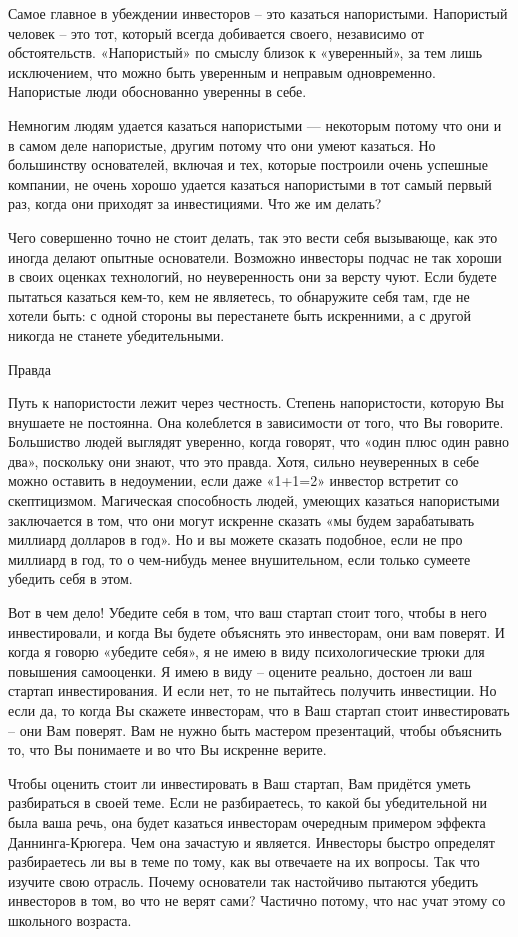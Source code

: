 \documentclass[ebook,12pt,oneside,openany]{memoir}
\begin{document}
Самое главное в убеждении инвесторов – это казаться напористыми.
Напористый человек – это тот, который всегда добивается своего,
независимо от обстоятельств. «Напористый» по смыслу близок к
«уверенный», за тем лишь исключением, что можно быть уверенным и
неправым одновременно. Напористые люди обоснованно уверенны в себе.

Немногим людям удается казаться напористыми — некоторым потому что они
и в самом деле напористые, другим потому что они умеют казаться. Но
большинству основателей, включая и тех, которые построили очень
успешные компании, не очень хорошо удается казаться напористыми в тот
самый первый раз, когда они приходят за инвестициями. Что же им
делать?

Чего совершенно точно не стоит делать, так это вести себя вызывающе,
как это иногда делают опытные основатели. Возможно инвесторы подчас не
так хороши в своих оценках технологий, но неуверенность они за версту
чуют. Если будете пытаться казаться кем-то, кем не являетесь, то
обнаружите себя там, где не хотели быть: с одной стороны вы
перестанете быть искренними, а с другой никогда не станете
убедительными.

Правда

Путь к напористости лежит через честность. Степень напористости,
которую Вы внушаете не постоянна. Она колеблется в зависимости от
того, что Вы говорите. Большиство людей выглядят уверенно, когда
говорят, что «один плюс один равно два», поскольку они знают, что это
правда. Хотя, сильно неуверенных в себе можно оставить в недоумении,
если даже «1+1=2» инвестор встретит со скептицизмом. Магическая
способность людей, умеющих казаться напористыми заключается в том, что
они могут искренне сказать «мы будем зарабатывать миллиард долларов в
год». Но и вы можете сказать подобное, если не про миллиард в год, то
о чем-нибудь менее внушительном, если только сумеете убедить себя в
этом.

Вот в чем дело! Убедите себя в том, что ваш стартап стоит того, чтобы
в него инвестировали, и когда Вы будете объяснять это инвесторам, они
вам поверят. И когда я говорю «убедите себя», я не имею в виду
психологические трюки для повышения самооценки. Я имею в виду –
оцените реально, достоен ли ваш стартап инвестирования. И если нет, то
не пытайтесь получить инвестиции. Но если да, то когда Вы скажете
инвесторам, что в Ваш стартап стоит инвестировать – они Вам поверят.
Вам не нужно быть мастером презентаций, чтобы объяснить то, что Вы
понимаете и во что Вы искренне верите.

Чтобы оценить стоит ли инвестировать в Ваш стартап, Вам придётся уметь
разбираться в своей теме. Если не разбираетесь, то какой бы
убедительной ни была ваша речь, она будет казаться инвесторам
очередным примером эффекта Даннинга-Крюгера. Чем она зачастую и
является. Инвесторы быстро определят разбираетесь ли вы в теме по
тому, как вы отвечаете на их вопросы. Так что изучите свою отрасль.
Почему основатели так настойчиво пытаются убедить инвесторов в том, во
что не верят сами? Частично потому, что нас учат этому со школьного
возраста.
\end{document}
